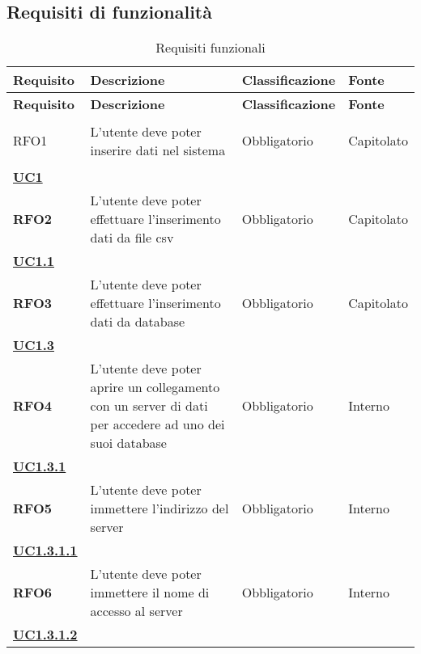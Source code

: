 \subsection{Requisiti di funzionalità}
\label{sub:requisiti_di_funzionalita}

\renewcommand{\arraystretch}{2} %
\begin{longtable}[H]{>{\centering\bfseries}m{2cm} >{\centering}m{9cm} >{\centering}m{2.5cm} >{\centering\arraybackslash}m{2.5cm}}
    \caption{Requisiti funzionali}%
    \label{tab:requisiti_funzionali} \\
    \rowcolor{lightgray}
    {\textbf{Requisito}} & {\textbf{Descrizione}} & {\textbf{Classificazione}} & {\textbf{Fonte}}  \\
    \endfirsthead%
    \rowcolor{lightgray}
    {\textbf{Requisito}} & {\textbf{Descrizione}} & {\textbf{Classificazione}} & {\textbf{Fonte}}  \\
    \endhead%
    \rowcolor{white}
    \multicolumn{4}{c}{\textit{Continua alla pagina successiva}}
    \endfoot%
    \endlastfoot%

    RFO1
    & L'utente deve poter inserire dati nel sistema 
    & Obbligatorio
    & Capitolato \\ \hyperref[sub:uc1]{UC1} \\

    RFO2
    & L'utente deve poter effettuare l'inserimento dati da file csv
    & Obbligatorio
    & Capitolato \\ \hyperref[ssub:uc1.1]{UC1.1} \\

    RFO3
    & L'utente deve poter effettuare l'inserimento dati da database
    & Obbligatorio
    & Capitolato \\ \hyperref[ssub:uc1.3]{UC1.3}\\

    RFO4
    &   L'utente deve poter aprire un collegamento con un server di dati per 
        accedere ad uno dei suoi database
    & Obbligatorio
    & Interno \\ \hyperref[par:uc1.3.1]{UC1.3.1}\\

    RFO5
    &   L'utente deve poter immettere l'indirizzo del server
    & Obbligatorio
    & Interno \\ \hyperref[spar:uc1.3.1.1]{UC1.3.1.1}\\

    RFO6
    &   L'utente deve poter immettere il nome di accesso al server
    & Obbligatorio
    & Interno \\ \hyperref[spar:uc1.3.1.2]{UC1.3.1.2}\\


\end{longtable}
